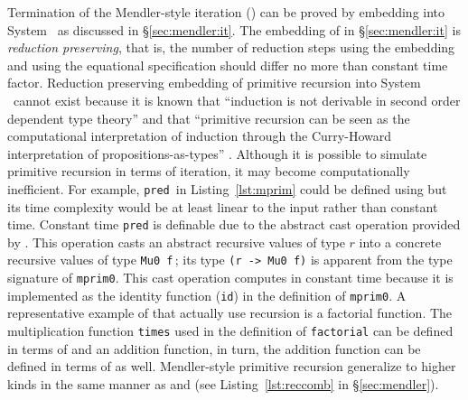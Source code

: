 Termination of the Mendler-style iteration (\MIt{}) can be proved by embedding
\MIt{} into System \Fw\ as discussed in \S\ref{sec:mendler:it}. The embedding
of \MIt{} in \S\ref{sec:mendler:it} is \emph{reduction preserving}, that is,
the number of reduction steps using the embedding and using
the equational specification should differ no more than constant time factor.
Reduction preserving embedding of primitive recursion into System \Fw\ cannot
exist because it is known that ``induction is not derivable in second order
dependent type theory'' \cite{Geuvers01} and that ``primitive recursion
can be seen as the computational interpretation of induction through
the Curry-Howard interpretation of propositions-as-types'' \cite{Hallnas92}.
Although it is possible to simulate primitive recursion in terms of iteration,
it may become computationally inefficient. For example, \lstinline{pred}\,
in Listing~\ref{lst:mprim} could be defined using \MIt{} but its time complexity
would be at least linear to the input rather than constant time. Constant time
\lstinline{pred} is definable due to the abstract cast operation provided by
\mpr{}. This operation casts an abstract recursive values of type $r$ into
a concrete recursive values of type \lstinline{Mu0 f}\,; its type
\lstinline{(r -> Mu0 f)} is apparent from the type signature of
\lstinline{mprim0}. This cast operation computes in constant time because
it is implemented as the identity function (\lstinline{id}) in the definition
of \lstinline{mprim0}. A representative example of \mpr{} that actually use
recursion is a factorial function. The multiplication function \lstinline{times}
used in the definition of \lstinline{factorial} can be defined in terms of
\MIt{*} and an addition function, in turn, the addition function can be defined
in terms of \MIt{*} as well. Mendler-style primitive recursion generalize to
higher kinds in the same manner as \MIt{} and \msfit{}
(see Listing~\ref{lst:reccomb} in \S\ref{sec:mendler}).


